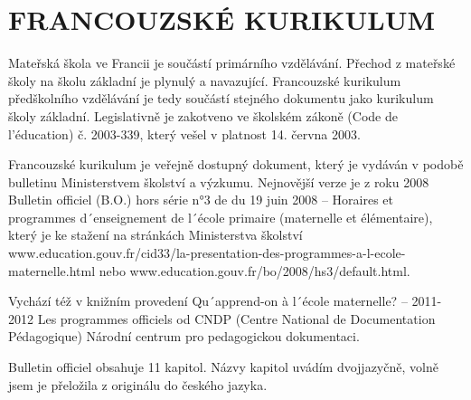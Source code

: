 \section{FRANCOUZSKÉ KURIKULUM}
	Mateřská škola ve Francii je součástí primárního vzdělávání. Přechod z mateřské školy na školu základní je plynulý a navazující. Francouzské kurikulum předškolního vzdělávání je tedy součástí stejného dokumentu jako kurikulum školy základní. Legislativně je zakotveno ve školském zákoně (Code de l'éducation) č. 2003-339, který vešel v platnost 14. června 2003.
		
	Francouzské kurikulum je veřejně dostupný dokument, který je vydáván v podobě bulletinu Ministerstvem školství a výzkumu. Nejnovější verze je z roku 2008 Bulletin officiel (B.O.) hors série n°3 de du 19 juin 2008 – Horaires et programmes d´enseignement de l´école primaire (maternelle et élémentaire), který je ke stažení na stránkách Ministerstva školství  www.education.gouv.fr/cid33/la-presentation-des-programmes-a-l-ecole-maternelle.html nebo www.education.gouv.fr/bo/2008/hs3/default.html.

	Vychází též v knižním provedení Qu´apprend-on à l´école maternelle? – 2011-2012 Les programmes officiels od CNDP (Centre National de Documentation Pédagogique) Národní centrum pro pedagogickou dokumentaci.

	Bulletin officiel obsahuje 11 kapitol. Názvy kapitol uvádím dvojjazyčně, volně jsem je přeložila z originálu do českého jazyka.

